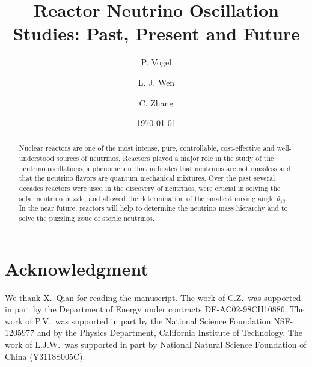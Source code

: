 \documentclass[aps,twocolumn,preprintnumbers,amsmath,superscriptaddress,amssymb,floats,nofootinbib]{revtex4-1}
\begin{document}
\title{Reactor Neutrino Oscillation Studies: Past, Present and Future}
\date{\today}
\author{P. Vogel}
\author{L. J. Wen}
\author{C. Zhang}


\begin{abstract}
Nuclear reactors are one of the most intense, pure, controllable, cost-effective and well-understood sources of neutrinos. Reactors played a major role in the study of the neutrino oscillations, a phenomenon that indicates that neutrinos are not massless and that the neutrino flavors are quantum mechanical mixtures. Over the past several decades reactors were used in the discovery of neutrinos, were crucial in solving the solar neutrino puzzle, and allowed the determination of the smallest mixing angle $\theta_{13}$. In the near future, reactors will help to determine the neutrino mass hierarchy and to solve the puzzling issue of sterile neutrinos.
\end{abstract}

\maketitle
\thispagestyle{plain}










\section*{Acknowledgment}
We thank X.~Qian for reading the manuscript.
The work of C.Z.~was supported in part by the Department of Energy under contracts DE-AC02-98CH10886.
The work of P.V.~was supported in part by the National Science Foundation NSF-1205977 and by the Physics Department, California Institute of Technology.
The work of L.J.W.~was supported in part by National Natural Science Foundation of China (Y3118S005C).



\end{document}
